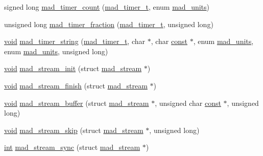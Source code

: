 \begin{DoxyCompactItemize}
\item 
signed long \hyperlink{mac_2config_2i386_2lib-src_2libmad_2mad_8h_ac145e00368b6f5c220e4b46b993e48dd}{mad\+\_\+timer\+\_\+count} (\hyperlink{structmad__timer__t}{mad\+\_\+timer\+\_\+t}, enum \hyperlink{lib-src_2libmad_2msvc_09_09_2mad_8h_a8b5cf795da949ab23ac909021d884fff}{mad\+\_\+units})
\item 
unsigned long \hyperlink{mac_2config_2i386_2lib-src_2libmad_2mad_8h_af1de1e98b27802f56d48d54f108305e2}{mad\+\_\+timer\+\_\+fraction} (\hyperlink{structmad__timer__t}{mad\+\_\+timer\+\_\+t}, unsigned long)
\item 
\hyperlink{sound_8c_ae35f5844602719cf66324f4de2a658b3}{void} \hyperlink{mac_2config_2i386_2lib-src_2libmad_2mad_8h_a2c7c6843a26c88347659c9c58c6c5f58}{mad\+\_\+timer\+\_\+string} (\hyperlink{structmad__timer__t}{mad\+\_\+timer\+\_\+t}, char $\ast$, char \hyperlink{getopt1_8c_a2c212835823e3c54a8ab6d95c652660e}{const} $\ast$, enum \hyperlink{lib-src_2libmad_2msvc_09_09_2mad_8h_a8b5cf795da949ab23ac909021d884fff}{mad\+\_\+units}, enum \hyperlink{lib-src_2libmad_2msvc_09_09_2mad_8h_a8b5cf795da949ab23ac909021d884fff}{mad\+\_\+units}, unsigned long)
\item 
\hyperlink{sound_8c_ae35f5844602719cf66324f4de2a658b3}{void} \hyperlink{mac_2config_2i386_2lib-src_2libmad_2mad_8h_a73f0fd6d3e3eca8d8413d14c021ccf7e}{mad\+\_\+stream\+\_\+init} (struct \hyperlink{structmad__stream}{mad\+\_\+stream} $\ast$)
\item 
\hyperlink{sound_8c_ae35f5844602719cf66324f4de2a658b3}{void} \hyperlink{mac_2config_2i386_2lib-src_2libmad_2mad_8h_a1a74f838480c1876a542b0f28e102c3c}{mad\+\_\+stream\+\_\+finish} (struct \hyperlink{structmad__stream}{mad\+\_\+stream} $\ast$)
\item 
\hyperlink{sound_8c_ae35f5844602719cf66324f4de2a658b3}{void} \hyperlink{mac_2config_2i386_2lib-src_2libmad_2mad_8h_ad093dc109695de5cbd7bb50b7f64249e}{mad\+\_\+stream\+\_\+buffer} (struct \hyperlink{structmad__stream}{mad\+\_\+stream} $\ast$, unsigned char \hyperlink{getopt1_8c_a2c212835823e3c54a8ab6d95c652660e}{const} $\ast$, unsigned long)
\item 
\hyperlink{sound_8c_ae35f5844602719cf66324f4de2a658b3}{void} \hyperlink{mac_2config_2i386_2lib-src_2libmad_2mad_8h_ae71c4bcac81926d21ad7509d11c0e8cc}{mad\+\_\+stream\+\_\+skip} (struct \hyperlink{structmad__stream}{mad\+\_\+stream} $\ast$, unsigned long)
\item 
\hyperlink{xmltok_8h_a5a0d4a5641ce434f1d23533f2b2e6653}{int} \hyperlink{mac_2config_2i386_2lib-src_2libmad_2mad_8h_a57761cd21ad16f10dde3c0b3e6ad2d95}{mad\+\_\+stream\+\_\+sync} (struct \hyperlink{structmad__stream}{mad\+\_\+stream} $\ast$)

\end{DoxyCompactItemize}
